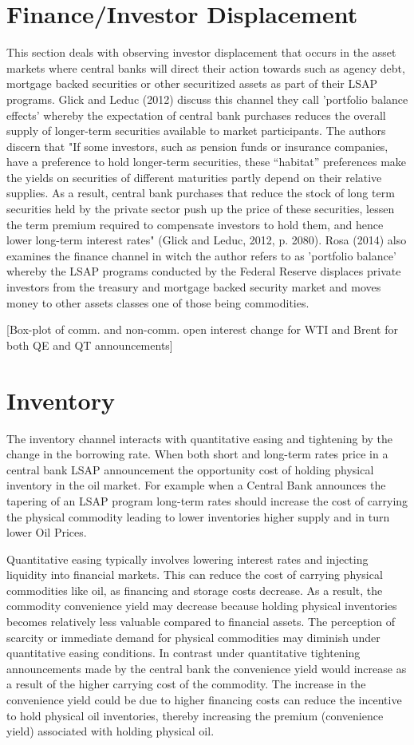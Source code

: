 \section{Finance/Investor Displacement}
This section deals with observing investor displacement that occurs in the asset markets where central banks will direct their action towards such as agency debt, mortgage backed securities or other securitized assets as part of their LSAP programs. Glick and Leduc (2012) discuss this channel they call 'portfolio balance effects' whereby the expectation of central bank purchases reduces the overall supply of longer-term securities available to market participants. The authors discern that "If some investors, such as pension funds or insurance companies, have a preference to hold longer-term securities, these “habitat” preferences make the yields on securities of different maturities partly depend on their relative supplies. As a result, central bank purchases that reduce the stock of long term securities held by the private sector push up the price of these securities, lessen the term premium required to compensate investors to hold them, and hence lower long-term interest rates" (Glick and Leduc, 2012, p. 2080).  Rosa (2014) also examines the finance channel in witch the author refers to as 'portfolio balance' whereby the LSAP programs conducted by the Federal Reserve displaces private investors from the treasury and mortgage backed security market and moves money to other assets classes one of those being commodities.

[Box-plot of comm. and non-comm. open interest change for WTI and Brent for both QE and QT announcements]

\section{Inventory
}The inventory channel interacts with quantitative easing and tightening by the change in the borrowing rate. When both short and long-term rates price in a central bank LSAP announcement the opportunity cost  of holding physical inventory in the oil market. For example when a Central Bank announces the tapering of an LSAP program long-term rates should increase the cost of carrying the physical commodity leading to lower inventories higher supply and in turn lower Oil Prices. 

Quantitative easing typically involves lowering interest rates and injecting liquidity into financial markets. This can reduce the cost of carrying physical commodities like oil, as financing and storage costs decrease. As a result, the commodity convenience yield may decrease because holding physical inventories becomes relatively less valuable compared to financial assets. The perception of scarcity or immediate demand for physical commodities may diminish under quantitative easing conditions. In contrast under quantitative tightening announcements made by the central bank the convenience yield would increase as a result of the higher carrying cost of the commodity. The increase in the convenience yield could be due to higher financing costs can reduce the incentive to hold physical oil inventories, thereby increasing the premium (convenience yield) associated with holding physical oil. 


